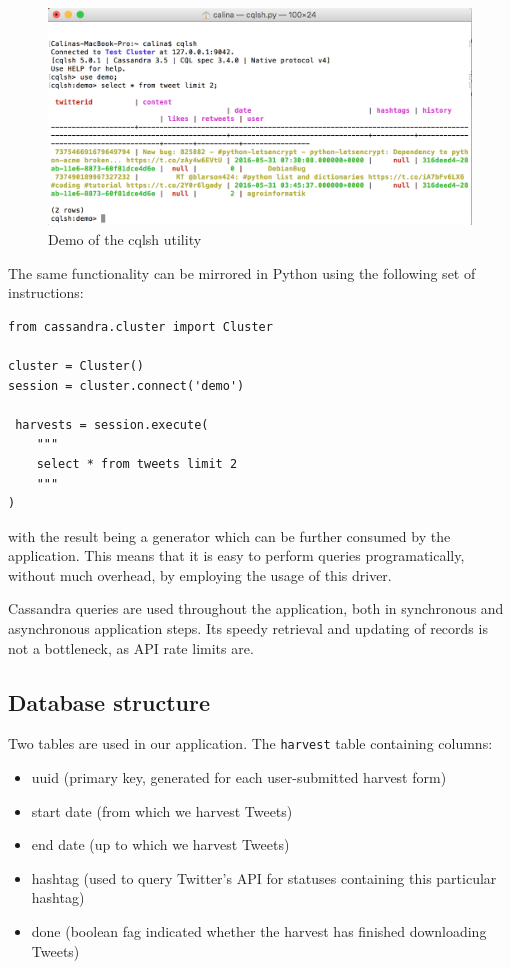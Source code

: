 \begin{figure}[ht]
    \centering
\includegraphics[width=0.8\columnwidth]{img/cqlsh.png}
    \caption{Demo of the cqlsh utility}
    \label{fig:cqlsh}
\end{figure}

The same functionality can be mirrored in Python using the following set of instructions:

\lstset{basicstyle=\scriptsize}
\begin{lstlisting}
from cassandra.cluster import Cluster

cluster = Cluster()
session = cluster.connect('demo')

 harvests = session.execute(
    """
    select * from tweets limit 2
    """
)
\end{lstlisting}

with the result being a generator which can be further consumed by the application. This means that it is easy to perform queries programatically, without much overhead, by employing the usage of this driver.

Cassandra queries are used throughout the application, both in synchronous and asynchronous application steps. Its speedy retrieval and updating of records is not a bottleneck, as API rate limits are.

\subsection{Database structure}
Two tables are used in our application. The \texttt{harvest} table containing columns:

\begin{itemize}
\item uuid (primary key, generated for each user-submitted harvest form)
\item start date (from which we harvest Tweets)
\item end date (up to which we harvest Tweets)
\item hashtag (used to query Twitter's API for statuses containing this particular hashtag)
\item done (boolean fag indicated whether the harvest has finished downloading Tweets)
\end{itemize}

